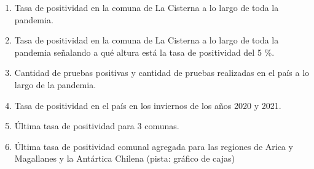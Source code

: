 \documentclass{article}
\begin{document}
\begin{enumerate}
    \item Tasa de positividad en la comuna de La Cisterna a lo largo de toda la pandemia.
    \item Tasa de positividad en la comuna de La Cisterna a lo largo de toda la pandemia señalando a qué altura está la tasa de positividad del 5 \%.
    \item Cantidad de pruebas positivas y cantidad de pruebas realizadas en el país a lo largo de la pandemia.
    \item Tasa de positividad en el país en los inviernos de los años 2020 y 2021.
    \item Última tasa de positividad para 3 comunas.
    \item Última tasa de positividad comunal agregada para las regiones de Arica y Magallanes y la Antártica Chilena (pista: gráfico de cajas)
\end{enumerate}
\end{document}

